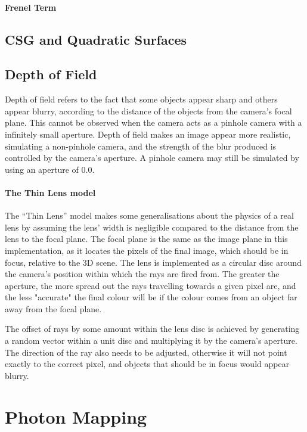 \documentclass[a4paper]{article}
\begin{document}
\paragraph{Frenel Term}

\subsection{CSG and Quadratic Surfaces}

\subsection{Depth of Field}\label{ss:depthoffield}
Depth of field refers to the fact that some objects appear sharp and others appear blurry, according to the distance of the objects from the camera's focal plane. This cannot be observed when the camera acts as a pinhole camera with a infinitely small aperture. Depth of field makes an image appear more realistic, simulating a non-pinhole camera, and the strength of the blur produced is controlled by the camera's aperture. A pinhole camera may still be simulated by using an aperture of $0.0$.

\paragraph{The Thin Lens model}
The ``Thin Lens'' model makes some generalisations about the physics of a real lens by assuming the lens' width is negligible compared to the distance from the lens to the focal plane. The focal plane is the same as the image plane in this implementation, as it locates the pixels of the final image, which should be in focus, relative to the 3D scene. The lens is implemented as a circular disc around the camera's position within which the rays are fired from. The greater the aperture, the more spread out the rays travelling towards a given pixel are, and the less "accurate" the final colour will be if the colour comes from an object far away from the focal plane.

The offset of rays by some amount within the lens disc is achieved by generating a random vector within a unit disc and multiplying it by the camera's aperture. The direction of the ray also needs to be adjusted, otherwise it will not point exactly to the correct pixel, and objects that should be in focus would appear blurry.

\section{Photon Mapping}
\end{document}
